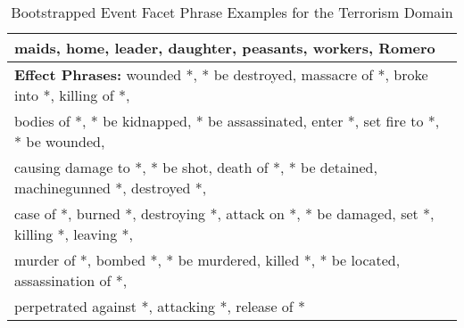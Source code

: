 \begin{table}[htbp]
\begin{tabular}[center]{|l|}
maids, home, leader, daughter, peasants, workers, Romero\\ 
\hline
{\bf Effect Phrases:} wounded *, * be destroyed, massacre of *, broke into *, killing of *, \\
bodies of *, * be kidnapped, * be assassinated, enter *, set fire to *, * be wounded,\\
causing damage to *, * be shot, death of *, * be detained, machinegunned *, destroyed *, \\ 
case of *, burned *, destroying *, attack on *, * be damaged, set *, killing *, leaving *, \\
murder of *, bombed *, * be murdered, killed *, * be located, assassination of *, \\ 
perpetrated against *, attacking *, release of *\\
\hline
\end{tabular}
\caption{Bootstrapped Event Facet Phrase Examples for the Terrorism Domain}
\label{sample-table-terrorism}
\end{table}

